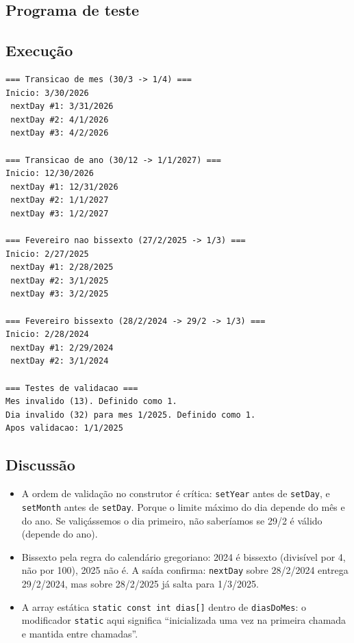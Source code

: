 \documentclass[11pt,a4paper]{article}
\begin{document}


\subsection*{Programa de teste}



\subsection*{Execu\c{c}\~ao}

\begin{saidabox}
\begin{lstlisting}[style=terminal]
=== Transicao de mes (30/3 -> 1/4) ===
Inicio: 3/30/2026
 nextDay #1: 3/31/2026
 nextDay #2: 4/1/2026
 nextDay #3: 4/2/2026

=== Transicao de ano (30/12 -> 1/1/2027) ===
Inicio: 12/30/2026
 nextDay #1: 12/31/2026
 nextDay #2: 1/1/2027
 nextDay #3: 1/2/2027

=== Fevereiro nao bissexto (27/2/2025 -> 1/3) ===
Inicio: 2/27/2025
 nextDay #1: 2/28/2025
 nextDay #2: 3/1/2025
 nextDay #3: 3/2/2025

=== Fevereiro bissexto (28/2/2024 -> 29/2 -> 1/3) ===
Inicio: 2/28/2024
 nextDay #1: 2/29/2024
 nextDay #2: 3/1/2024

=== Testes de validacao ===
Mes invalido (13). Definido como 1.
Dia invalido (32) para mes 1/2025. Definido como 1.
Apos validacao: 1/1/2025
\end{lstlisting}
\end{saidabox}

\subsection*{Discuss\~ao}

\begin{itemize}[leftmargin=*]
  \item A ordem de valida\c{c}\~ao no construtor \'e cr\'itica: \texttt{setYear} antes de \texttt{setDay}, e \texttt{setMonth} antes de \texttt{setDay}. Porque o limite m\'aximo do dia depende do m\^es e do ano. Se vali\c{c}\'assemos o dia primeiro, n\~ao saber\'iamos se 29/2 \'e v\'alido (depende do ano).
  \item Bissexto pela regra do calend\'ario gregoriano: 2024 \'e bissexto (divis\'ivel por 4, n\~ao por 100), 2025 n\~ao \'e. A sa\'ida confirma: \texttt{nextDay} sobre 28/2/2024 entrega 29/2/2024, mas sobre 28/2/2025 j\'a salta para 1/3/2025.
  \item A array est\'atica \texttt{static const int dias[]} dentro de \texttt{diasDoMes}: o modificador \texttt{static} aqui significa ``inicializada uma vez na primeira chamada e mantida entre chamadas''.
\end{itemize}
\end{document}
